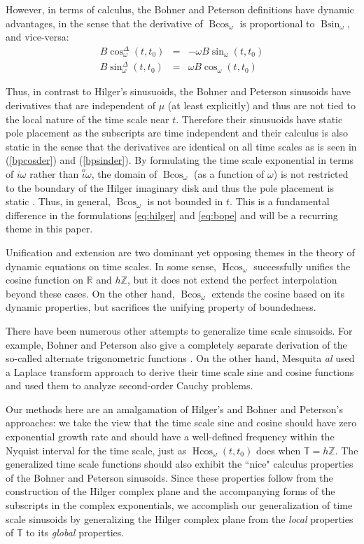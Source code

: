 \documentclass[reqno]{amsart}
\theoremstyle{plain}
\theoremstyle{definition}
\numberwithin{theorem}{section}
\numberwithin{definition}{section}
\numberwithin{prop}{section}
\numberwithin{example}{section}
\newcommand{\T}{\ensuremath{\mathbb{T}}}
\DeclareMathOperator{\Hcos}{Hcos} %
\DeclareMathOperator{\Bcos}{Bcos} %
\DeclareMathOperator{\Bsin}{Bsin}
\begin{document}
However, in terms of calculus, the Bohner and Peterson definitions have dynamic advantages, in the sense that the derivative of $\Bcos_{\omega}$ is proportional to $\Bsin_{\omega}$, and vice-versa:
\begin{eqnarray}
    B\cos_\omega^{\Delta}(t,t_0) & = & -\omega B\sin_{\omega}(t,t_0) \label{bpcosder}\\
    B\sin_\omega^{\Delta}(t,t_0) & = & \omega B\cos_{\omega}(t,t_0) \label{bpsinder}
\end{eqnarray}

Thus, in contrast to Hilger's sinusuoids, the Bohner and Peterson sinusoids have derivatives that are independent of $\mu$ (at least explicitly) and thus are not tied to the local nature of the time scale near $t$.  Therefore their sinusuoids have static pole placement as the subscripts are time independent and their calculus is also static in the sense that the derivatives are identical on all time scales as is seen in (\ref{bpcosder}) and (\ref{bpsinder}).
By formulating the time scale exponential in terms of $i \omega$ rather than $\stackrel{o}{\iota}\omega$, the domain of $\Bcos_{\omega}$ (as a function of $\omega$) is not restricted to the boundary of the Hilger imaginary disk and thus the pole placement is static . Thus, in general, $\Bcos_{\omega}$ is not bounded in $t$. This is a fundamental difference in the formulations \eqref{eq:hilger} and \eqref{eq:bope} and will be a recurring theme in this paper.

Unification and extension are two dominant yet opposing themes in the theory of dynamic equations on time scales. In some sense, $\Hcos_{\omega}$ successfully unifies the cosine function on $\mathbb{R}$ and $h\mathbb{Z}$, but it does not extend the perfect interpolation beyond these cases. On the other hand, $\Bcos_{\omega}$ extends the cosine based on its dynamic properties, but sacrifices the unifying property of boundedness. 

There have been numerous other attempts to generalize time scale sinusoids. For example, Bohner and Peterson \cite{BoPe} also give a completely separate derivation of the so-called alternate trigonometric functions \cite{BoPe, Sec. 3.6}. On the other hand, Mesquita {\it al} \cite{} used a Laplace transform approach to derive their time scale sine and cosine functions and used them to analyze second-order Cauchy problems.

Our methods here are an amalgamation of Hilger's and Bohner and Peterson's approaches: we take the view that the time scale sine and cosine should have zero exponential growth rate and should have a well-defined frequency within the Nyquist interval for the time scale, just as $\Hcos_{\omega}(t,t_0)$ does when $\mathbb{T}=h\mathbb{Z}$. The generalized time scale functions should also exhibit the ``nice" calculus properties of the Bohner and Peterson sinusoids. Since these properties follow from the construction of the Hilger complex plane and the accompanying forms of the subscripts in the complex exponentials, we accomplish our generalization of time scale sinusoids by generalizing the Hilger complex plane from the {\em local} properties of $\T$ to its {\em global} properties.
\end{document}
